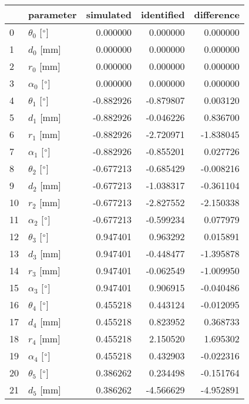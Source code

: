 \documentclass{standalone}%
\begin{document}
%
\normalsize%
\begin{tabular}{llrrr}
\toprule
{} &                 parameter & simulated & identified & difference \\
\midrule
0  &  $\theta_{0}$ [$\degree$] &  0.000000 &   0.000000 &   0.000000 \\
1  &              $d_{0}$ [mm] &  0.000000 &   0.000000 &   0.000000 \\
2  &              $r_{0}$ [mm] &  0.000000 &   0.000000 &   0.000000 \\
3  &  $\alpha_{0}$ [$\degree$] &  0.000000 &   0.000000 &   0.000000 \\
4  &  $\theta_{1}$ [$\degree$] & -0.882926 &  -0.879807 &   0.003120 \\
5  &              $d_{1}$ [mm] & -0.882926 &  -0.046226 &   0.836700 \\
6  &              $r_{1}$ [mm] & -0.882926 &  -2.720971 &  -1.838045 \\
7  &  $\alpha_{1}$ [$\degree$] & -0.882926 &  -0.855201 &   0.027726 \\
8  &  $\theta_{2}$ [$\degree$] & -0.677213 &  -0.685429 &  -0.008216 \\
9  &              $d_{2}$ [mm] & -0.677213 &  -1.038317 &  -0.361104 \\
10 &              $r_{2}$ [mm] & -0.677213 &  -2.827552 &  -2.150338 \\
11 &  $\alpha_{2}$ [$\degree$] & -0.677213 &  -0.599234 &   0.077979 \\
12 &  $\theta_{3}$ [$\degree$] &  0.947401 &   0.963292 &   0.015891 \\
13 &              $d_{3}$ [mm] &  0.947401 &  -0.448477 &  -1.395878 \\
14 &              $r_{3}$ [mm] &  0.947401 &  -0.062549 &  -1.009950 \\
15 &  $\alpha_{3}$ [$\degree$] &  0.947401 &   0.906915 &  -0.040486 \\
16 &  $\theta_{4}$ [$\degree$] &  0.455218 &   0.443124 &  -0.012095 \\
17 &              $d_{4}$ [mm] &  0.455218 &   0.823952 &   0.368733 \\
18 &              $r_{4}$ [mm] &  0.455218 &   2.150520 &   1.695302 \\
19 &  $\alpha_{4}$ [$\degree$] &  0.455218 &   0.432903 &  -0.022316 \\
20 &  $\theta_{5}$ [$\degree$] &  0.386262 &   0.234498 &  -0.151764 \\
21 &              $d_{5}$ [mm] &  0.386262 &  -4.566629 &  -4.952891 \\

\end{tabular}
\end{document}
